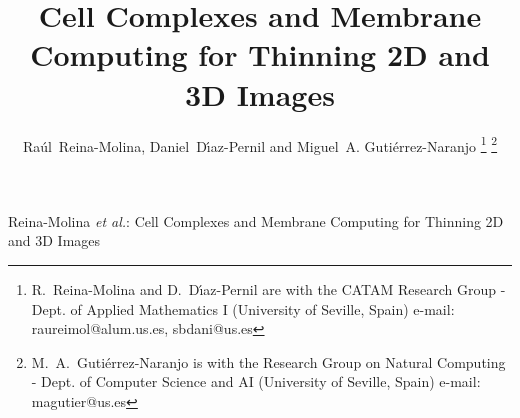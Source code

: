 \documentclass[journal]{IEEEtran}
\begin{document}
\title{Cell Complexes and Membrane Computing for Thinning 2D and 3D Images}

\author{
	Ra\'ul~Reina-Molina,
	Daniel~D\'{\i}az-Pernil and
	Miguel~A. Guti\'errez-Naranjo
\thanks{
	R.~Reina-Molina and D.~D\'{\i}az-Pernil are with the CATAM Research Group - Dept. of Applied Mathematics I
   (University of Seville, Spain)
   e-mail: raureimol@alum.us.es, sbdani@us.es
}
\thanks{
	M.~A.~Guti\'errez-Naranjo is with the Research Group on Natural Computing - Dept. of Computer Science and AI
	(University of Seville, Spain)
	e-mail: magutier@us.es
}}

%
{Reina-Molina \MakeLowercase{\textit{et al.}}: Cell Complexes and Membrane Computing for Thinning 2D and 3D Images}

\maketitle
\end{document}
